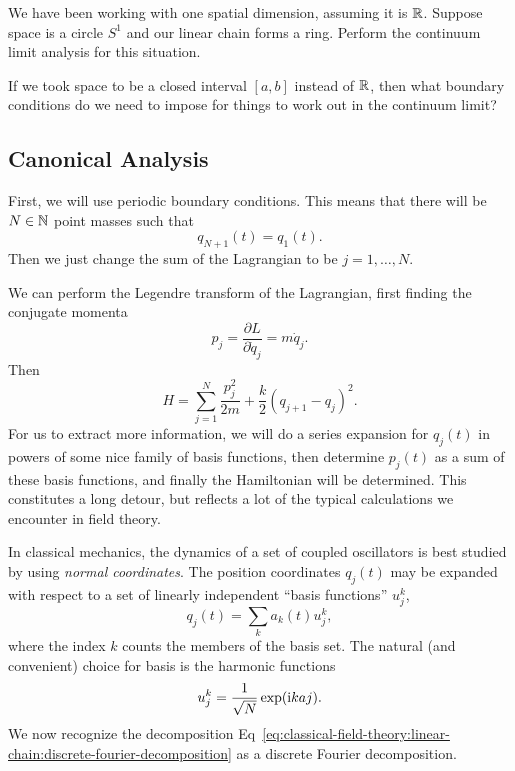 \begin{exercise}
We have been working with one spatial dimension, assuming it is $\mathbb{R}$.
Suppose space is a circle $S^{1}$ and our linear chain forms a
ring. Perform the continuum limit analysis for this situation.
\end{exercise}

\begin{exercise}
If we took space to be a closed interval $[a,b]$ instead of $\mathbb{R}$,
then what boundary conditions do we need to impose for things to work
out in the continuum limit?
\end{exercise}

\subsection{Canonical Analysis}

First, we will use periodic boundary conditions. This means that there
will be $N\in\mathbb{N}$ point masses such that
\begin{equation}
q_{N+1}(t) = q_{1}(t).
\end{equation}
Then we just change the sum of the Lagrangian to be $j=1,\dots,N$.

We can perform the Legendre transform of the Lagrangian, first finding
the conjugate momenta
\begin{equation}\label{eq:classical-field-theory:linear-chain:momentum}
p_{j} = \frac{\partial L}{\partial\dot{q}_{j}} = m\dot{q}_{j}.
\end{equation}
Then
\begin{equation}
H = \sum^{N}_{j=1}\frac{p_{j}^{2}}{2m} + \frac{k}{2}(q_{j+1}-q_{j})^{2}.
\end{equation}
For us to extract more information, we will do a series expansion for
$q_{j}(t)$ in powers of some nice family of basis functions, then
determine $p_{j}(t)$ as a sum of these basis functions, and finally the
Hamiltonian will be determined. This constitutes a long detour, but
reflects a lot of the typical calculations we encounter in field theory. 

In classical mechanics, the dynamics of a set of coupled oscillators is
best studied by using \emph{normal coordinates}. The position
coordinates $q_{j}(t)$ may be expanded with respect to a set of linearly
independent ``basis functions'' $u_{j}^{k}$,
\begin{equation}\label{eq:classical-field-theory:linear-chain:discrete-fourier-decomposition}
q_{j}(t) = \sum_{k}a_{k}(t)u^{k}_{j},
\end{equation}
where the index $k$ counts the members of the basis set. The natural
(and convenient) choice for basis is the harmonic functions
\begin{equation}\label{eq:classical-field-theory:linear-chain:basis-harmonic-functions}
u_{j}^{k} = \frac{1}{\sqrt{N}}\exp(\mathrm{i} kaj).
\end{equation}
We now recognize the decomposition Eq~\eqref{eq:classical-field-theory:linear-chain:discrete-fourier-decomposition}
as a discrete Fourier decomposition.

